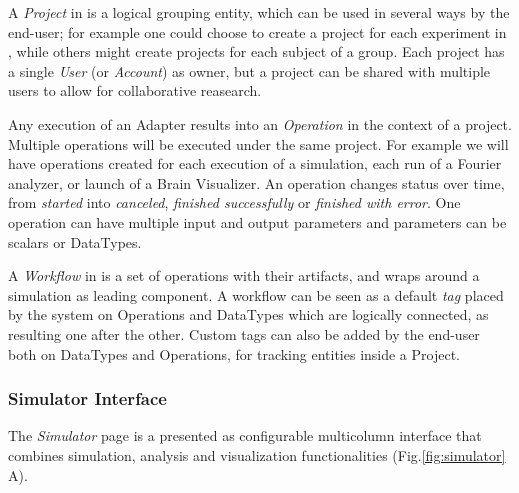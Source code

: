 		A \emph{Project} in \TVB is a logical grouping entity, which  can be
		used in several ways by the end-user;  for example one could choose to
		create a project for each experiment in \TVB, while others might
		create projects for each subject of a group. Each project has a single
		\emph{User} (or \emph{Account}) as owner, but a project can be shared
		with multiple users to allow for collaborative reasearch.

		Any execution of an Adapter results into an \emph{Operation} in the
		context of a project. Multiple operations will be executed under the
		same project. For example we will have operations created for each
		execution of a simulation, each run of a Fourier analyzer, or launch
		of a Brain Visualizer. An operation changes status over time, from
		\emph{started} into \emph{canceled}, \emph{finished successfully} or
		\emph{finished with error}. One operation can have multiple input and
		output parameters and parameters can be scalars or DataTypes.

		A \emph{Workflow} in \TVB is a set of operations with their artifacts,
		and wraps around a simulation as leading component. A workflow can be
		seen as a default \emph{tag} placed by the system on Operations and
		DataTypes  which are logically connected, as resulting one after the
		other. Custom tags can also be added by the end-user both on DataTypes
		and Operations, for tracking entities inside a Project.

		\subsubsection{Simulator Interface}

		The \emph{Simulator} page is a presented as configurable multicolumn interface that combines \TVB simulation, analysis and visualization functionalities (Fig.\ref{fig:simulator} A).

